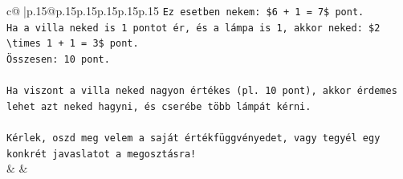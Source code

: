 \documentclass{article}
\begin{document}
{\begin{supertabular}{c@{$\;$}|p{.15\linewidth}@{}p{.15\linewidth}p{.15\linewidth}p{.15\linewidth}p{.15\linewidth}p{.15\linewidth}}
{{{\texttt{Ez esetben nekem: \$6 + 1 = 7\$ pont.} \\
\texttt{Ha a villa neked is 1 pontot ér, és a lámpa is 1, akkor neked: \$2 \textbackslash{}times 1 + 1 = 3\$ pont.} \\
\texttt{Összesen: 10 pont.} \\
\\ 
\texttt{Ha viszont a villa neked nagyon értékes (pl. 10 pont), akkor érdemes lehet azt neked hagyni, és cserébe több lámpát kérni.} \\
\\ 
\texttt{Kérlek, oszd meg velem a saját értékfüggvényedet, vagy tegyél egy konkrét javaslatot a megosztásra!} \\
            }
        }
    }
    & & \\ \\


\end{supertabular}}
\end{document}
